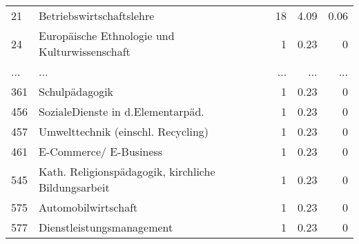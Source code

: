 \begin{longtable}{lXrrr}
        21 & \multicolumn{1}{X}{Betriebswirtschaftslehre} & %
          \num{18} &
          \num[round-mode=places,round-precision=2]{4.09} &
          \num[round-mode=places,round-precision=2]{0.06} \\
        24 & \multicolumn{1}{X}{Europäische Ethnologie und Kulturwissenschaft} & %
          \num{1} &
          \num[round-mode=places,round-precision=2]{0.23} &
          \num[round-mode=places,round-precision=2]{0} \\
       ... & ... & ... & ... & ... \\
        361 & \multicolumn{1}{X}{Schulpädagogik} & %
          \num{1} &
          \num[round-mode=places,round-precision=2]{0.23} &
          \num[round-mode=places,round-precision=2]{0} \\

        456 & \multicolumn{1}{X}{SozialeDienste in d.Elementarpäd.} & %
          \num{1} &
          \num[round-mode=places,round-precision=2]{0.23} &
          \num[round-mode=places,round-precision=2]{0} \\

        457 & \multicolumn{1}{X}{Umwelttechnik (einschl. Recycling)} & %
          \num{1} &
          \num[round-mode=places,round-precision=2]{0.23} &
          \num[round-mode=places,round-precision=2]{0} \\

        461 & \multicolumn{1}{X}{E-Commerce/ E-Business} & %
          \num{1} &
          \num[round-mode=places,round-precision=2]{0.23} &
          \num[round-mode=places,round-precision=2]{0} \\

        545 & \multicolumn{1}{X}{Kath. Religionspädagogik, kirchliche Bildungsarbeit} & %
          \num{1} &
          \num[round-mode=places,round-precision=2]{0.23} &
          \num[round-mode=places,round-precision=2]{0} \\

        575 & \multicolumn{1}{X}{Automobilwirtschaft} & %
          \num{1} &
          \num[round-mode=places,round-precision=2]{0.23} &
          \num[round-mode=places,round-precision=2]{0} \\

        577 & \multicolumn{1}{X}{Dienstleistungsmanagement} & %
          \num{1} &
          \num[round-mode=places,round-precision=2]{0.23} &
          \num[round-mode=places,round-precision=2]{0} \\


\end{longtable}
